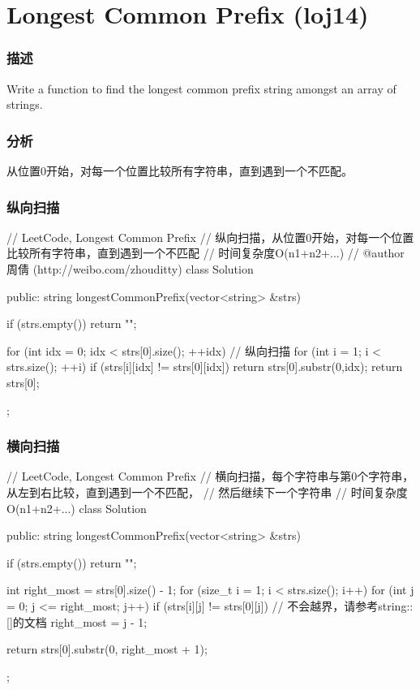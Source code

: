 \section{Longest Common Prefix (loj14)} %
\label{sec:longest-common-prefix}


\subsubsection{描述}
Write a function to find the longest common prefix string amongst an array of strings.


\subsubsection{分析}
从位置0开始，对每一个位置比较所有字符串，直到遇到一个不匹配。


\subsubsection{纵向扫描}
\begin{Code}
// LeetCode, Longest Common Prefix
// 纵向扫描，从位置0开始，对每一个位置比较所有字符串，直到遇到一个不匹配
// 时间复杂度O(n1+n2+...)
// @author 周倩 (http://weibo.com/zhouditty)
class Solution {
public:
    string longestCommonPrefix(vector<string> &strs) {
        if (strs.empty()) return "";

        for (int idx = 0; idx < strs[0].size(); ++idx) { // 纵向扫描
            for (int i = 1; i < strs.size(); ++i) {
                if (strs[i][idx] != strs[0][idx]) return strs[0].substr(0,idx);
            }
        }
        return strs[0];
    }
};
\end{Code}


\subsubsection{横向扫描}
\begin{Code}
// LeetCode, Longest Common Prefix
// 横向扫描，每个字符串与第0个字符串，从左到右比较，直到遇到一个不匹配，
// 然后继续下一个字符串
// 时间复杂度O(n1+n2+...)
class Solution {
public:
    string longestCommonPrefix(vector<string> &strs) {
        if (strs.empty()) return "";

        int right_most = strs[0].size() - 1;
        for (size_t i = 1; i < strs.size(); i++)
            for (int j = 0; j <= right_most; j++)
                if (strs[i][j] != strs[0][j])  // 不会越界，请参考string::[]的文档
                    right_most = j - 1;

        return strs[0].substr(0, right_most + 1);
    }
};
\end{Code}

